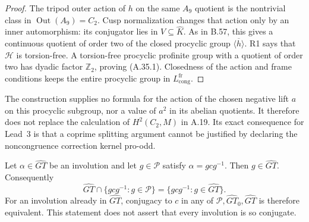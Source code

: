\begin{proof}
The tripod outer action of \(h\) on the same
\(A_9\) quotient is the nontrivial class in
\(\operatorname{Out}(A_9)=C_2\). Cusp normalization
changes that action only by an inner automorphism:
its conjugator lies in \(V\subseteq\widehat K\).
As in B.57, this gives a continuous quotient of order
two of the closed procyclic group
\(\overline{\langle h\rangle}\). R1 says that
\(\mathcal H\) is torsion-free. A torsion-free
procyclic profinite group with a quotient of order
two has dyadic factor \(\mathbb Z_2\), proving
(A.35.1). Closedness of the action and frame
conditions keeps the entire procyclic group in
\(L_{\mathrm{cong}}^{\mathrm{fr}}\).
\end{proof}

The construction supplies no formula for the action
of the chosen negative lift \(a\) on this procyclic
subgroup, nor a value of \(a^2\) in its abelian
quotients. It therefore does not replace the
calculation of \(H^2(C_2,M)\) in A.19. Its exact
consequence for Lead~3 is that a coprime splitting
argument cannot be justified by declaring the
noncongruence correction kernel pro-odd.


Let \(\alpha\in\widehat{GT}\) be an involution and let
\(g\in\mathcal P\) satisfy \(\alpha=g c g^{-1}\).
Then \(g\in\widehat{GT}\). Consequently
\[
 \widehat{GT}\cap\{g c g^{-1}:g\in\mathcal P\}
   =\{g c g^{-1}:g\in\widehat{GT}\}.
 \tag{A.36.1}
\]
For an involution already in \(\widehat{GT}\), conjugacy
to \(c\) in any of \(\mathcal P,\widehat{GT}_0,
\widehat{GT}\) is therefore equivalent. This statement
does not assert that every involution is so conjugate.

